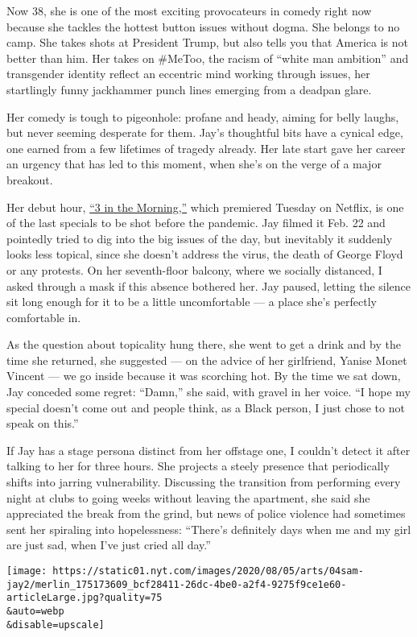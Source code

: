 Now 38, she is one of the most exciting provocateurs in comedy right now
because she tackles the hottest button issues without dogma. She belongs
to no camp. She takes shots at President Trump, but also tells you that
America is not better than him. Her takes on \#MeToo, the racism of
``white man ambition'' and transgender identity reflect an eccentric
mind working through issues, her startlingly funny jackhammer punch
lines emerging from a deadpan glare.

Her comedy is tough to pigeonhole: profane and heady, aiming for belly
laughs, but never seeming desperate for them. Jay's thoughtful bits have
a cynical edge, one earned from a few lifetimes of tragedy already. Her
late start gave her career an urgency that has led to this moment, when
she's on the verge of a major breakout.

Her debut hour, \href{https://www.youtube.com/watch?v=D2EcvFfzu-o}{``3
in the Morning,''} which premiered Tuesday on Netflix, is one of the
last specials to be shot before the pandemic. Jay filmed it Feb. 22 and
pointedly tried to dig into the big issues of the day, but inevitably it
suddenly looks less topical, since she doesn't address the virus, the
death of George Floyd or any protests. On her seventh-floor balcony,
where we socially distanced, I asked through a mask if this absence
bothered her. Jay paused, letting the silence sit long enough for it to
be a little uncomfortable --- a place she's perfectly comfortable in.

As the question about topicality hung there, she went to get a drink and
by the time she returned, she suggested --- on the advice of her
girlfriend, Yanise Monet Vincent --- we go inside because it was
scorching hot. By the time we sat down, Jay conceded some regret:
``Damn,'' she said, with gravel in her voice. ``I hope my special
doesn't come out and people think, as a Black person, I just chose to
not speak on this.''

If Jay has a stage persona distinct from her offstage one, I couldn't
detect it after talking to her for three hours. She projects a steely
presence that periodically shifts into jarring vulnerability. Discussing
the transition from performing every night at clubs to going weeks
without leaving the apartment, she said she appreciated the break from
the grind, but news of police violence had sometimes sent her spiraling
into hopelessness: ``There's definitely days when me and my girl are
just sad, when I've just cried all day.''

\texttt{[image: https://static01.nyt.com/images/2020/08/05/arts/04sam-jay2/merlin\_175173609\_bcf28411-26dc-4be0-a2f4-9275f9ce1e60-articleLarge.jpg?quality=75\\\&auto=webp\\\&disable=upscale]}

